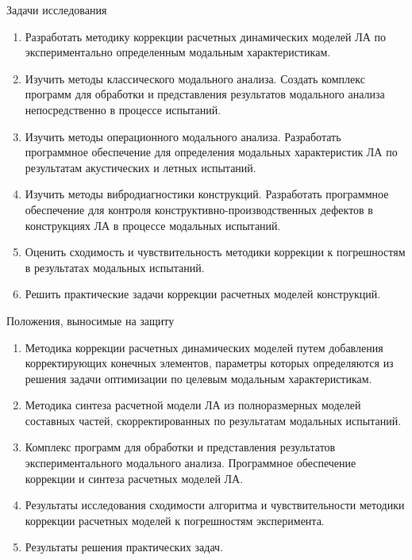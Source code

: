 \begin{frame}{Задачи исследования}
	\begin{enumerate}
		\item Разработать методику коррекции расчетных динамических моделей ЛА по экспериментально определенным модальным характеристикам.
		\item Изучить методы классического модального анализа. Создать комплекс программ для обработки и представления результатов модального анализа непосредственно в процессе испытаний.
		\item Изучить методы операционного модального анализа. Разработать программное обеспечение для определения модальных характеристик ЛА по результатам акустических и летных испытаний.
		\item Изучить методы вибродиагностики конструкций. Разработать программное обеспечение для контроля конструктивно-производственных дефектов в конструкциях ЛА в процессе модальных испытаний.
		\item Оценить сходимость и чувствительность методики коррекции к погрешностям в результатах модальных испытаний.
		\item Решить практические задачи коррекции расчетных моделей конструкций.
	\end{enumerate}
\end{frame}

\begin{frame}{Положения, выносимые на защиту}
	\begin{enumerate}
		\item Методика коррекции расчетных динамических моделей путем добавления корректирующих конечных элементов, параметры которых определяются из решения задачи оптимизации по целевым модальным характеристикам.
		\item Методика синтеза расчетной модели ЛА из полноразмерных моделей составных частей, скорректированных по результатам модальных испытаний.
		\item Комплекс программ для обработки и представления результатов экспериментального модального анализа. Программное обеспечение коррекции и синтеза расчетных моделей ЛА.
		\item Результаты исследования сходимости алгоритма и чувствительности методики коррекции расчетных моделей к погрешностям эксперимента.
		\item Результаты решения практических задач.
	\end{enumerate}
\end{frame}

